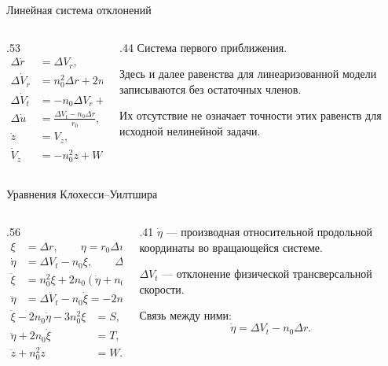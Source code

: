 \documentclass[11pt,aspectratio=169,t]{beamer}
\newcommand{\eqcompact}{\fontsize{10}{12}\selectfont}
\begin{document}
\begin{frame}{Линейная система отклонений}
\relax
\begin{columns}[T,onlytextwidth]
\begin{column}{.53\textwidth}
{\derivationmathspacing
\[
\boxed{\begin{aligned}
 \Delta\dot r&=\Delta V_r,\\[4pt]
 \Delta\dot V_r&=n_0^2\Delta r+2n_0\Delta V_t+S,\\[4pt]
 \Delta\dot V_t&=-n_0\Delta V_r+T,\\[4pt]
 \Delta\dot u&=\frac{\Delta V_t-n_0\Delta r}{r_0},\\[4pt]
 \dot z&=V_z,\\[4pt]
 \dot V_z&=-n_0^2z+W.
\end{aligned}}
\]
}
\end{column}
\begin{column}{.44\textwidth}
\RaggedRight
Система первого приближения.\par\medskip
Здесь и далее равенства для линеаризованной модели записываются без остаточных членов.\par\medskip
Их отсутствие не означает точности этих равенств для исходной нелинейной задачи.
\end{column}
\end{columns}
\end{frame}

\begin{frame}{Уравнения Клохесси--Уилтшира}
\relax
\begin{columns}[T,onlytextwidth]
\begin{column}{.56\textwidth}
{\eqcompact\derivationmathspacing
\[
\begin{aligned}
 \xi&=\Delta r,\qquad \eta=r_0\Delta u,\\[4pt]
 \dot\eta&=\Delta V_t-n_0\xi,\qquad
 \Delta V_t=\dot\eta+n_0\xi,\\[4pt]
 \ddot\xi&=n_0^2\xi+2n_0(\dot\eta+n_0\xi)+S,\\[4pt]
 \ddot\eta&=\Delta\dot V_t-n_0\dot\xi=-2n_0\dot\xi+T.
\end{aligned}
\]
\[
\boxed{\begin{aligned}
 \ddot\xi-2n_0\dot\eta-3n_0^2\xi&=S,\\[5pt]
 \ddot\eta+2n_0\dot\xi&=T,\\[5pt]
 \ddot z+n_0^2z&=W.
\end{aligned}}
\]
}
\end{column}
\begin{column}{.41\textwidth}
\RaggedRight
$\dot\eta$ — производная относительной продольной координаты во вращающейся системе.\par\medskip
$\Delta V_t$ — отклонение физической трансверсальной скорости.\par\medskip
Связь между ними:
\[
\dot\eta=\Delta V_t-n_0\Delta r.
\]
\end{column}
\end{columns}
\end{frame}
\end{document}
